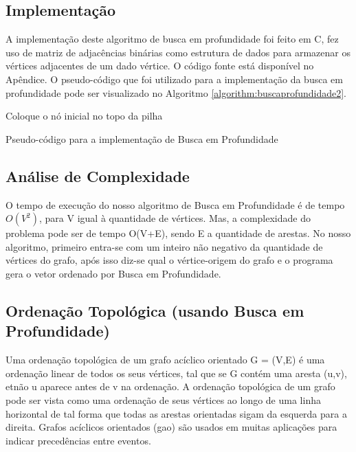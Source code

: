 \documentclass[a4paper,12pt]{article}
\begin{document}
\subsection{Implementação}

A implementação deste algoritmo de busca em profundidade foi feito em C, fez uso de matriz de adjacências binárias como estrutura de dados para armazenar os vértices adjacentes de um dado vértice. O código fonte está disponível no Apêndice. O pseudo-código que foi utilizado para a implementação da busca em profundidade pode ser visualizado no Algoritmo \ref{algorithm:buscaprofundidade2}.

\begin{algorithm}[H]
\SetAlgoLined
\LinesNumbered
{}
Coloque o nó inicial no topo da pilha\;
\caption{Pseudo-código para a implementação de Busca em Profundidade}
\label{algorithm:buscaprofundidade2}
\end{algorithm}


\subsection{Análise de Complexidade}

O tempo de execução do nosso algoritmo de Busca em Profundidade é de tempo $O(V^2)$, para V igual à quantidade de vértices. Mas, a complexidade do problema pode ser de tempo O(V+E), sendo E a quantidade de arestas.
No nosso algoritmo, primeiro entra-se com um inteiro não negativo da quantidade de vértices do grafo, após isso diz-se qual o vértice-origem do grafo e o programa gera o vetor ordenado por Busca em Profundidade.

\subsection{Ordenação Topológica (usando Busca em Profundidade)}

Uma ordenação topológica de um grafo acíclico orientado G = (V,E) é uma ordenação linear de todos os seus vértices, tal que se G contém uma aresta (u,v), etnão u aparece antes de v na ordenação. A ordenação topológica de um grafo pode ser vista como uma ordenação de seus vértices ao longo de uma linha horizontal de tal forma que todas as arestas orientadas sigam da esquerda para a direita. 
Grafos acíclicos orientados (gao) são usados em muitas aplicações para indicar precedências entre eventos.\\
\end{document}
